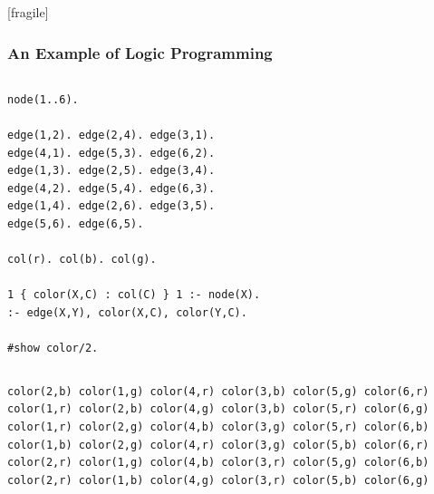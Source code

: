 \documentclass[bigger]{beamer}
\begin{document}
\begin{frame}
    [fragile]
    \frametitle{An Example of Logic Programming}
    \begin{columns}[c]
        \scriptsize
        \begin{lstlisting} 
node(1..6).

edge(1,2). edge(2,4). edge(3,1).
edge(4,1). edge(5,3). edge(6,2).
edge(1,3). edge(2,5). edge(3,4).
edge(4,2). edge(5,4). edge(6,3).
edge(1,4). edge(2,6). edge(3,5).
edge(5,6). edge(6,5).

col(r). col(b). col(g).

1 { color(X,C) : col(C) } 1 :- node(X).
:- edge(X,Y), color(X,C), color(Y,C).

#show color/2.
        \end{lstlisting}
    \end{columns}
    \vfill
    \scriptsize
    \begin{lstlisting}    
color(2,b) color(1,g) color(4,r) color(3,b) color(5,g) color(6,r)
color(1,r) color(2,b) color(4,g) color(3,b) color(5,r) color(6,g)
color(1,r) color(2,g) color(4,b) color(3,g) color(5,r) color(6,b)
color(1,b) color(2,g) color(4,r) color(3,g) color(5,b) color(6,r)
color(2,r) color(1,g) color(4,b) color(3,r) color(5,g) color(6,b)
color(2,r) color(1,b) color(4,g) color(3,r) color(5,b) color(6,g)
    \end{lstlisting}
\end{frame}
\end{document}
